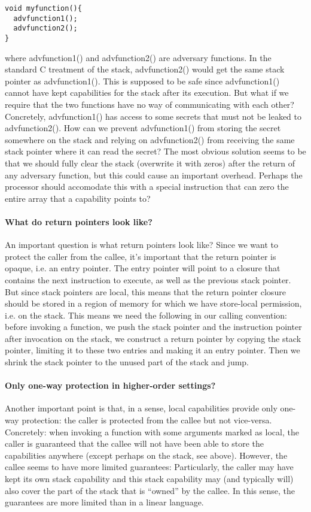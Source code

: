\documentclass{article}
\begin{document}
\begin{verbatim}
void myfunction(){
  advfunction1();
  advfunction2();
}
\end{verbatim}

where advfunction1() and advfunction2() are adversary functions. In the standard
C treatment of the stack, advfunction2() would get the same stack pointer as
advfunction1(). This is supposed to be safe since advfunction1() cannot have
kept capabilities for the stack after its execution. But what if we require that
the two functions have no way of communicating with each other? Concretely,
advfunction1() has access to some secrets that must not be leaked to
advfunction2(). How can we prevent advfunction1() from storing the secret
somewhere on the stack and relying on advfunction2() from receiving the same
stack pointer where it can read the secret? The most obvious solution seems to
be that we should fully clear the stack (overwrite it with zeros) after the
return of any adversary function, but this could cause an important overhead.
Perhaps the processor should accomodate this with a special instruction that can
zero the entire array that a capability points to?

\paragraph{What do return pointers look like?}
An important question is what return pointers look like? Since we want to
protect the caller from the callee, it's important that the return pointer is
opaque, i.e. an entry pointer. The entry pointer will point to a closure that
contains the next instruction to execute, as well as the previous stack pointer.
But since stack pointers are local, this means that the return pointer closure
should be stored in a region of memory for which we have store-local permission,
i.e. on the stack. This means we need the following in our calling convention:
before invoking a function, we push the stack pointer and the instruction
pointer after invocation on the stack, we construct a return pointer by
copying the stack pointer, limiting it to these two entries and making it an
entry pointer.  Then we shrink the stack pointer to the unused part of the stack
and jump. 

\paragraph{Only one-way protection in higher-order settings?}
Another important point is that, in a sense, local capabilities provide only
one-way protection: the caller is protected from the callee but not vice-versa.
Concretely: when invoking a function with some arguments marked as local, the
caller is guaranteed that the callee will not have been able to store the
capabilities anywhere (except perhaps on the stack, see above). However, the
callee seems to have more limited guarantees: Particularly, the caller may have
kept its own stack capability and this stack capability may (and typically will)
also cover the part of the stack that is ``owned'' by the callee.  In this
sense, the guarantees are more limited than in a linear language.
\end{document}

